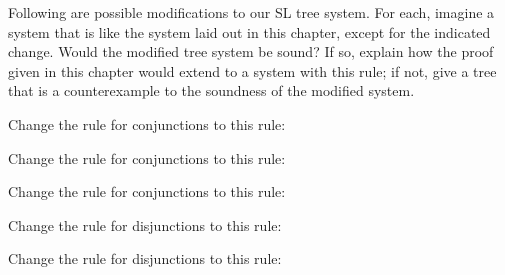 \iffalse

\practiceproblems

\solutions
\problempart
\label{pr.SL.soundness-resolutions}
Following are possible modifications to our SL tree system. For each, imagine a system that is like the system laid out in this chapter, except for the indicated change. Would the modified tree system be sound? If so, explain how the proof given in this chapter would extend to a system with this rule; if not, give a tree that is a counterexample to the soundness of the modified system.
\begin{earg}
\item Change the rule for conjunctions to this rule:

\item Change the rule for conjunctions to this rule:

\item Change the rule for conjunctions to this rule:

\item Change the rule for disjunctions to this rule:

\item Change the rule for disjunctions to this rule:


\end{earg}
